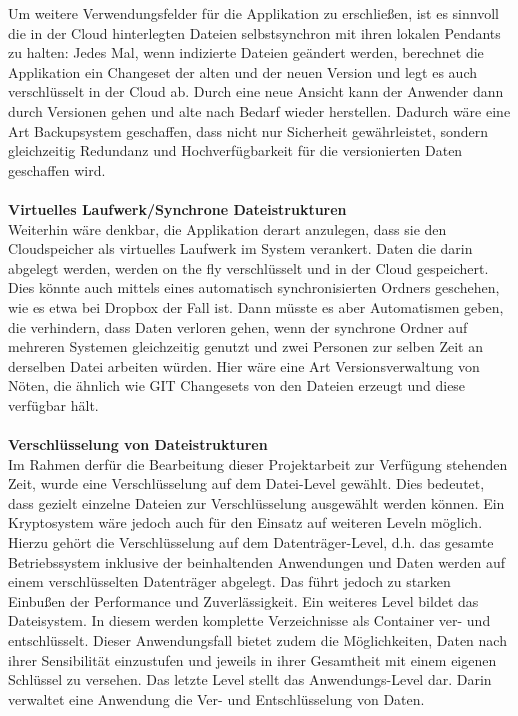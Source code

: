 \documentclass[13pt,a4paper,bibliography=totocnumbered,listof=totocnumbered]{scrartcl}
\begin{document}
Um weitere Verwendungsfelder für die Applikation zu erschließen, ist es sinnvoll die in der Cloud hinterlegten Dateien selbstsynchron mit ihren lokalen Pendants zu halten: Jedes Mal, wenn indizierte Dateien geändert werden, berechnet die Applikation ein Changeset der alten und der neuen Version und legt es auch verschlüsselt in der Cloud ab. Durch eine neue Ansicht kann der Anwender dann durch Versionen gehen und alte nach Bedarf wieder herstellen. Dadurch wäre eine Art Backupsystem geschaffen, dass nicht nur Sicherheit gewährleistet, sondern gleichzeitig Redundanz und Hochverfügbarkeit für die versionierten Daten geschaffen wird.\\
\\\textbf{Virtuelles Laufwerk/Synchrone Dateistrukturen}\\
Weiterhin wäre denkbar, die Applikation derart anzulegen, dass sie den Cloudspeicher als virtuelles Laufwerk im System verankert. Daten die darin abgelegt werden, werden on the fly verschlüsselt und in der Cloud gespeichert. Dies könnte auch mittels eines automatisch synchronisierten Ordners geschehen, wie es etwa bei Dropbox der Fall ist. Dann müsste es aber Automatismen geben, die verhindern, dass Daten verloren gehen, wenn der synchrone Ordner auf mehreren Systemen gleichzeitig genutzt und zwei Personen zur selben Zeit an derselben Datei arbeiten würden. Hier wäre eine Art Versionsverwaltung von Nöten, die ähnlich wie GIT Changesets von den Dateien erzeugt und diese verfügbar hält.\\
\\\textbf{Verschlüsselung von Dateistrukturen}\\
Im Rahmen derfür die Bearbeitung dieser Projektarbeit zur Verfügung stehenden Zeit, wurde eine Verschlüsselung auf dem Datei-Level gewählt. Dies bedeutet, dass gezielt einzelne Dateien zur Verschlüsselung ausgewählt werden können. Ein Kryptosystem wäre jedoch auch für den Einsatz auf weiteren Leveln möglich. Hierzu gehört die Verschlüsselung auf dem Datenträger-Level, d.h. das gesamte Betriebssystem inklusive der beinhaltenden Anwendungen und Daten werden auf einem verschlüsselten Datenträger abgelegt. Das führt jedoch zu starken Einbußen der Performance und Zuverlässigkeit. Ein weiteres Level bildet das Dateisystem. In diesem werden komplette Verzeichnisse als Container ver- und entschlüsselt. Dieser Anwendungsfall bietet zudem die Möglichkeiten, Daten nach ihrer Sensibilität einzustufen und jeweils in ihrer Gesamtheit mit einem eigenen Schlüssel zu versehen. Das letzte Level stellt das Anwendungs-Level dar. Darin verwaltet eine Anwendung die Ver- und Entschlüsselung von Daten. \cite{38}\\
\end{document}
